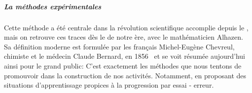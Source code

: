       \subparagraph{La méthodes expérimentales}
        Cette méthode a été centrale dans la révolution scientifique accomplie depuis le , mais on retrouve ces traces dès le  de notre ère, avec le mathématicien Alhazen. Sa définition moderne est formulée par les français Michel-Eugène Chevreul, chimiste et le médecin Claude Bernard, en 1856~ et se voit résumée aujourd'hui ainsi pour le grand public:
        C'est exactement les méthodes que nous tentons de promouvoir dans la construction de nos activités. Notamment, en proposant des situations d'apprentissage propices à la progression par essai - erreur.
